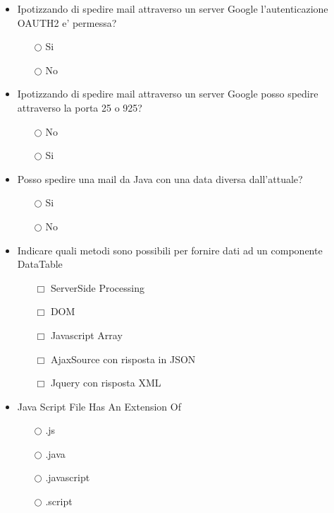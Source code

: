 \documentclass[10pt,twocolumn]{article}
\begin{document}
\begin{itemize}
    \item Ipotizzando di spedire mail attraverso un server Google l'autenticazione OAUTH2 e' permessa?
          \begin{itemize}
              \item[$\bigcirc$] Si
              \item[$\bigcirc$] No
          \end{itemize}
\end{itemize}
\begin{itemize}
    \item Ipotizzando di spedire mail attraverso un server Google posso spedire attraverso la porta 25 o 925?
          \begin{itemize}
              \item[$\bigcirc$] No
              \item[$\bigcirc$] Si
          \end{itemize}
\end{itemize}
\begin{itemize}
    \item Posso spedire una mail da Java con una data diversa dall'attuale?
          \begin{itemize}
              \item[$\bigcirc$] Si
              \item[$\bigcirc$] No
          \end{itemize}
\end{itemize}
\begin{itemize}
    \item Indicare quali metodi sono possibili per fornire dati ad un componente DataTable
          \begin{itemize}
              \item[$\Box$] ServerSide Processing
              \item[$\Box$] DOM
              \item[$\Box$] Javascript Array
              \item[$\Box$] AjaxSource con risposta in JSON
              \item[$\Box$] Jquery con risposta XML
          \end{itemize}
\end{itemize}
\begin{itemize}
    \item Java Script File Has An Extension Of
          \begin{itemize}
              \item[$\bigcirc$] .js
              \item[$\bigcirc$] .java
              \item[$\bigcirc$] .javascript
              \item[$\bigcirc$] .script
          \end{itemize}
\end{itemize}
\end{document}
